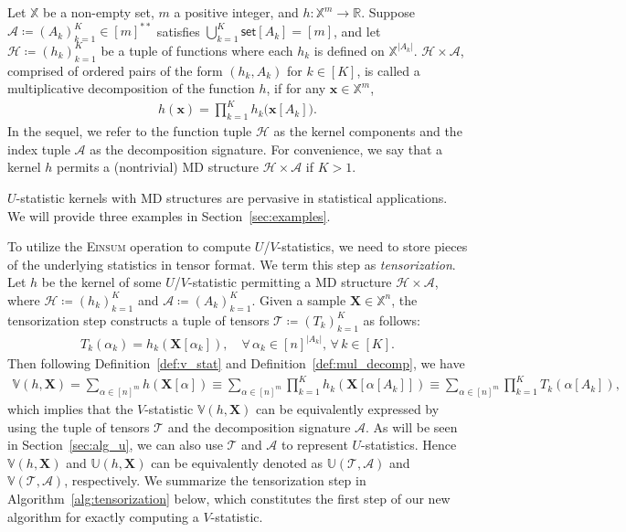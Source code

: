 \documentclass[twoside,11pt]{article}
\def\Einsum{\textsc{Einsum}}
\newcommand{\ustat}{\mathbb{U}}
\newcommand{\vstat}{\mathbb{V}}
\newcommand{\samplespace}{\bbX}
\newcommand{\takesetp}[1]{\mathsf{set}[#1]}
\def\bbX{\mathbb{X}}
\def\bbR{\mathbb{R}}
\def\calA{\mathcal{A}}
\def\calT{\mathcal{T}}
\def\calH{\mathcal{H}}
\begin{document}
\begin{definition}\label{def:mul_decomp}
Let $\samplespace$ be a non-empty set, $m$ a positive integer, and $h: \samplespace^m \to \bbR$. Suppose $\calA \coloneqq (A_k)_{k=1}^K \in [m]^{**}$ satisfies $\bigcup_{k=1}^K \takesetp{A_k} = [m]$, and let $\calH \coloneqq (h_k)_{k=1}^K$ be a tuple of functions where each $h_k$ is defined on $\samplespace^{|A_k|}$. $\calH \times \calA$, comprised of ordered pairs of the form $(h_{k}, A_{k})$ for $k \in [K]$, is called a multiplicative decomposition of the function $h$, if for any $\bm{x} \in \samplespace^m$, 
\begin{align*}
h(\bm{x}) = \prod_{k=1}^K h_k\big(\bm{x}[A_k]\big).
\end{align*}
In the sequel, we refer to the function tuple $\calH$ as the kernel components and the index tuple $\calA$ as the decomposition signature. For convenience, we say that a kernel $h$ permits a (nontrivial) MD structure $\calH \times \calA$ if $K > 1$.
\end{definition}

$U$-statistic kernels with MD structures are pervasive in statistical applications. We will provide three examples in Section~\ref{sec:examples}.

To utilize the \Einsum{} operation to compute $U$/$V$-statistics, we need to store pieces of the underlying statistics in tensor format. We term this step as \emph{tensorization}. Let $h$ be the kernel of some $U$/$V$-statistic permitting a MD structure $\calH \times \calA$, where $\calH \coloneqq (h_k)_{k=1}^K$ and $\calA \coloneqq (A_k)^K_{k=1}$. Given a sample $\bm{X} \in \samplespace^n$, the tensorization step constructs a tuple of tensors $\calT \coloneqq (T_k)_{k=1}^K$ as follows:
\begin{align*}
T_k (\alpha_k) = h_k (\bm{X}[\alpha_k]), \quad \forall \, \alpha_k \in [n]^{|A_k|}, \, \forall \, k \in [K].
\end{align*}
Then following Definition~\ref{def:v_stat} and Definition~\ref{def:mul_decomp}, we have
\begin{align}\label{eq:tensorization_v}
\vstat(h, \bm{X}) = \sum_{\alpha \in [n]^m} h(\bm{X}[\alpha]) \equiv \sum_{\alpha \in [n]^m} \prod_{k=1}^K h_k(\bm{X}[\alpha[A_k]]) \equiv \sum_{\alpha \in [n]^m} \prod_{k=1}^K T_k(\alpha[A_k]), 
\end{align}
which implies that the $V$-statistic $\vstat(h, \bm{X})$ can be equivalently expressed by using the tuple of tensors $\calT$ and the decomposition signature $\calA$. As will be seen in Section~\ref{sec:alg_u}, we can also use $\calT$ and $\calA$ to represent $U$-statistics. Hence $\vstat(h, \bm{X})$ and $\ustat(h, \bm{X})$ can be equivalently denoted as $\ustat(\calT, \calA)$ and $\vstat(\calT, \calA)$, respectively. We summarize the tensorization step in Algorithm~\ref{alg:tensorization} below, which constitutes the first step of our new algorithm for exactly computing a $V$-statistic.
\end{document}
